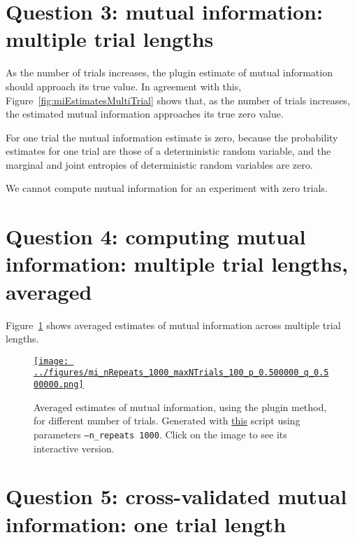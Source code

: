 \documentclass[12pt]{article}
\begin{document}
\section*{Question 3: mutual information: multiple trial lengths}

As the number of trials increases, the plugin estimate of mutual information
should approach its true value. In agreement with this,
Figure~\ref{fig:miEstimatesMultiTrial} shows that, as the number of trials
increases, the estimated mutual information approaches its true zero value.

For one trial the mutual information estimate is zero, because the probability
estimates for one trial are those of a deterministic random variable, and the
marginal and joint entropies of deterministic random variables are zero.

We cannot compute mutual information for an experiment with  zero trials.

\section*{Question 4: computing mutual information: multiple trial lengths, averaged}

Figure~\ref{fig:miEstimatesMultiTrialAveraged} shows averaged estimates of
mutual information across multiple trial lengths.

\begin{figure}[H]
    \begin{center}
        \href{https://www.gatsby.ucl.ac.uk/~rapela/neuroinformatics/2023/ws8/figures/mi_nRepeats_1000_maxNTrials_100_p_0.500000_q_0.500000.html}{\texttt{[image: ../figures/mi\_nRepeats\_1000\_maxNTrials\_100\_p\_0.500000\_q\_0.500000.png]}}

        \caption{Averaged estimates of mutual information, using the plugin method, for different number of trials.
        Generated with
        \href{https://github.com/joacorapela/neuroinformatics23/blob/master/worksheets/ws8/mySolution/code/scripts/doEstimateMI_multiTrials.py}{this}
        script using parameters \texttt{--n\_repeats 1000}. Click on the image to see its
        interactive version.}

        \label{fig:miEstimatesMultiTrialAveraged}
    \end{center}
\end{figure}

\section*{Question 5: cross-validated mutual information: one trial length}
\end{document}
